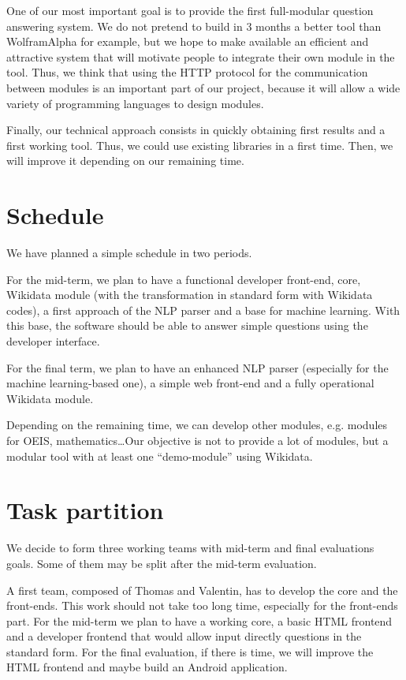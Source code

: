 \documentclass[a4paper,10pt]{article}
\begin{document}
One of our most important goal is to provide the first full-modular question 
answering system. We do not pretend to build in 3 months a better tool than 
WolframAlpha for example, but we hope to make available an efficient and 
attractive system that will motivate people to integrate their own module in the 
tool. Thus, we think that using the HTTP protocol for the communication between 
modules is an important part of our project, because it will allow a wide variety 
of programming languages to design modules.

Finally, our technical approach consists in quickly obtaining first results and 
a first working tool. Thus, we could use existing libraries in a first time. Then, 
we will improve it depending on our remaining time.

\section{Schedule}

We have planned a simple schedule in two periods.

For the mid-term, we plan to have a functional developer front-end, core, 
Wikidata module (with the transformation in standard form with Wikidata codes), 
a first approach of the NLP parser and a base for machine learning. With this 
base, the software should be able to answer simple questions using the developer 
interface.

For the final term, we plan to have an enhanced NLP parser (especially for the 
machine learning-based one), a simple web front-end and a fully operational 
Wikidata module.

Depending on the remaining time, we can develop other modules, e.g. modules for 
OEIS, mathematics\ldots Our objective is not to provide a lot of modules, but a 
modular tool with at least one ``demo-module'' using Wikidata.

\section{Task partition}

We decide to form three working teams with mid-term and final evaluations goals. Some of them
may be split after the mid-term evaluation.

A first team, composed of Thomas and Valentin, has to develop the core and the front-ends.
This work should not take too long time, especially for the front-ends part. For the mid-term
we plan to have a working core, a basic HTML frontend and a developer frontend that would
allow input directly questions in the standard form. For the final evaluation, if there is time,
we will improve the HTML frontend and maybe build an Android application.
\end{document}
